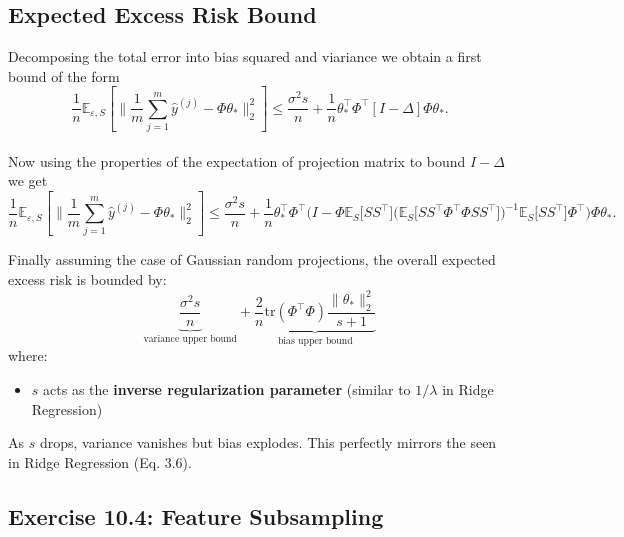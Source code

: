 \documentclass[
11pt,notheorems,hyperref={pdfauthor=whatever}
]{beamer}
\begin{document}
\subsection{Expected Excess Risk Bound}
\begin{frame}
    Decomposing the total error into bias squared and viariance we obtain a first bound of the form \\
    \[\frac{1}{n} \mathbb{E}_{\varepsilon, S} [ \| \frac{1}{m} \sum_{j=1}^m \hat{y}^{(j)} - \Phi\theta_* \|_2^2 ] \le \frac{\sigma^2 s}{n} + \frac{1}{n} \theta_*^\top \Phi^\top [I - \Delta] \Phi\theta_*.\] \\
    Now using the properties of the expectation of projection matrix to bound \(I - \Delta\) we get 
    \begin{equation}
        \frac{1}{n} \mathbb{E}_{\varepsilon, S} [ \| \frac{1}{m} \sum_{j=1}^m \hat{y}^{(j)} - \Phi\theta_* \|_2^2 ] \le  \frac{\sigma^2 s}{n} + \frac{1}{n} \theta_*^\top \Phi^\top \Big( I - \Phi \mathbb{E}_S \big[SS^\top\big] \big( \mathbb{E}_S \big[SS^\top \Phi^\top \Phi SS^\top\big] \big)^{-1} \mathbb{E}_S \big[SS^\top\big] \Phi^\top \Big) \Phi\theta_*.
    \end{equation}
    
    Finally assuming the case of Gaussian random projections, the overall expected excess risk is bounded by:
    \[
        \underbrace{\frac{\sigma^2 s}{n}}_{\text{variance upper bound}} + \underbrace{\frac{2}{n}\text{tr}(\Phi^\top\Phi)\frac{\|\theta_*\|_2^2}{s+1}}_{\text{bias upper bound}}
    \]
    where:
    \begin{itemize}
        \item \(s\) acts as the \alert{\textbf{inverse regularization parameter}} (similar to \(1/\lambda\) in Ridge Regression)
    \end{itemize}
    As \(s\) drops, variance vanishes but bias explodes. This perfectly mirrors the  seen in Ridge Regression (Eq. 3.6).
\end{frame}

\subsection{Exercise 10.4: Feature Subsampling}
\end{document}
